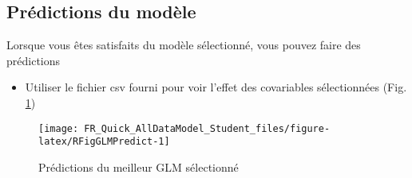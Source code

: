 \documentclass[french,a4paper]{article}
\providecommand{\tightlist}{%
  \setlength{\itemsep}{0pt}\setlength{\parskip}{0pt}}
\begin{document}
\subsection{Prédictions du modèle}\label{predictions-du-modele}

Lorsque vous êtes satisfaits du modèle sélectionné, vous pouvez faire
des prédictions

\begin{itemize}
\tightlist
\item
  Utiliser le fichier csv fourni pour voir l'effet des covariables
  sélectionnées (Fig. \ref{fig:RFigGLMPredict})
\end{itemize}



\begin{figure}[!h]

{\centering \texttt{[image: FR\_Quick\_AllDataModel\_Student\_files/figure-latex/RFigGLMPredict-1]} 

}

\caption{Prédictions du meilleur GLM sélectionné}\label{fig:RFigGLMPredict}
\end{figure}
\end{document}
